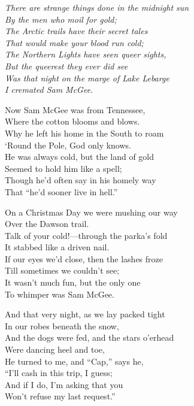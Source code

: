 
\begin{poemblock}
\textit{
There are strange things done in the midnight sun\\
\idt By the men who moil for gold;\\
The Arctic trails have their secret tales\\
\idt That would make your blood run cold;\\
The Northern Lights have seen queer sights,\\
\idt But the queerest they ever did see\\
Was that night on the marge of Lake Lebarge\\
\idt I cremated Sam McGee.
}

Now Sam McGee was from Tennessee,\\
\idt Where the cotton blooms and blows.\\
Why he left his home in the South to roam\\
\idt ‘Round the Pole, God only knows.\\
He was always cold, but the land of gold\\
\idt Seemed to hold him like a spell;\\
Though he’d often say in his homely way\\
\idt That “he’d sooner live in hell.”

On a Christmas Day we were mushing our way\\
\idt Over the Dawson trail.\\
Talk of your cold!—through the parka’s fold\\
\idt It stabbed like a driven nail.\\
If our eyes we’d close, then the lashes froze\\
\idt Till sometimes we couldn’t see;\\
It wasn’t much fun, but the only one\\
\idt To whimper was Sam McGee.

And that very night, as we lay packed tight\\
\idt In our robes beneath the snow,\\
And the dogs were fed, and the stars o’erhead\\
\idt Were dancing heel and toe,\\
He turned to me, and “Cap,” says he,\\
\idt “I’ll cash in this trip, I guess;\\
And if I do, I’m asking that you\\
\idt Won’t refuse my last request.”


\end{poemblock}
